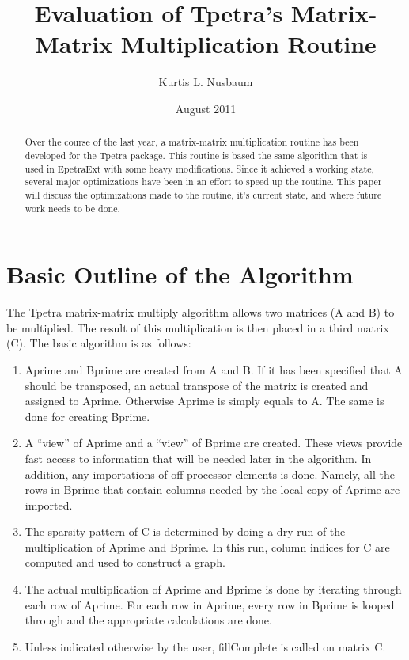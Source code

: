 \documentclass{article}
\title{Evaluation of Tpetra's Matrix-Matrix Multiplication Routine}
\author{Kurtis L. Nusbaum}
\date{August 2011}
\begin{document}
\maketitle

\begin{abstract}
Over the course of the last year, a matrix-matrix multiplication routine has been developed for the Tpetra package.
This routine is based the same algorithm that is used in EpetraExt with some heavy modifications. Since it 
achieved a working state, several major optimizations have been in an effort to speed up the routine. This paper will
discuss the optimizations made to the routine, it's current state, and where future work needs to be done.
\end{abstract}
\clearpage
\tableofcontents
\clearpage

\section{Basic Outline of the Algorithm}
The Tpetra matrix-matrix multiply algorithm allows two matrices (A and B) to be multiplied. The result of this 
multiplication is then placed in a third matrix (C).
The basic algorithm is as follows:
\begin{enumerate}
  \item Aprime and Bprime are created from A and B. If it has been specified that A should be transposed, an actual 
  transpose of the matrix is created and assigned to Aprime. Otherwise Aprime is simply equals to A. The same is done for 
  creating Bprime.
  \item A ``view'' of Aprime and a ``view'' of Bprime are created. These views provide fast access to information that 
  will be needed later in the algorithm. In addition, any importations of off-processor elements is done. Namely, all the 
  rows in Bprime that contain columns needed by the local copy of Aprime are imported.
  \item The sparsity pattern of C is determined by doing a dry run of the multiplication of Aprime and Bprime. In this run, 
  column indices for C are computed and used to construct a graph.
  \item The actual multiplication of Aprime and Bprime is done by iterating through each row of Aprime. For each row in 
  Aprime, every row in Bprime is looped through and the appropriate calculations are done.
  \item Unless indicated otherwise by the user, fillComplete is called on matrix C.
\end{enumerate}
\end{document}

